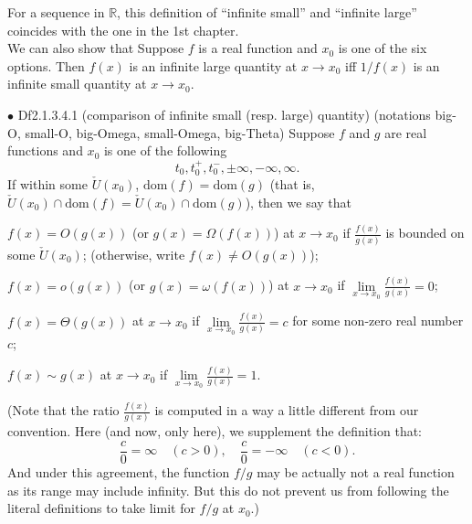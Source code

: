 \documentclass{article}
\begin{document}
\begin{Rmk}{}
    \textcolor{Th}{For a sequence in $\mathbb{R}$, this definition of ``infinite small'' and ``infinite large'' coincides with the one in the 1st chapter.}\\
    We can also show that \textcolor{Th}{Suppose $f$ is a real function and $x_0$ is one of the six options. Then $f(x)$ is an infinite large quantity at $x\rightarrow x_0$ iff $1/f(x)$ is an infinite small quantity at $x\rightarrow x_0$.}
\end{Rmk}

\begin{Df}{$\bullet$ Df2.1.3.4.1 (comparison of infinite small (resp. large) quantity) (notations big-O, small-O, big-Omega, small-Omega, big-Theta)}
    Suppose $f$ and $g$ are real functions and $x_0$ is one of the following
    $$ t_0, t_0^+, t_0^-, \pm\infty, -\infty, \infty. $$
    If within some $\check{U}(x_0)$, $\text{dom}(f) = \text{dom}(g)$ (that is, $\check{U}(x_0)\cap\text{dom}(f) = \check{U}(x_0)\cap\text{dom}(g)$), then we say that
    \begin{compactenum}
        \item $f(x) = O(g(x))$ (or $g(x) = \Omega(f(x))$) at $x\rightarrow x_0$ if $\frac{f(x)}{g(x)}$ is bounded on some $\check{U}(x_0)$; (otherwise, write $f(x) \neq O(g(x))$);
        \item $f(x) = o(g(x))$ (or $g(x) = \omega(f(x))$) at $x\rightarrow x_0$ if $\lim\limits_{x\to x_0}\frac{f(x)}{g(x)} = 0$;
        \item $f(x) = \Theta(g(x))$ at $x\rightarrow x_0$ if $\lim\limits_{x\to x_0}\frac{f(x)}{g(x)} = c$ for some non-zero real number $c$;
        \item $f(x) \sim g(x)$ at $x\rightarrow x_0$ if $\lim\limits_{x\to x_0}\frac{f(x)}{g(x)} = 1$.
    \end{compactenum}
    (Note that the ratio $\frac{f(x)}{g(x)}$ is computed in a way a little different from our convention. Here (and now, only here), we supplement the definition that:
    $$ \frac{c}{0} = \infty\quad (c>0),\quad \frac{c}{0} = -\infty\quad (c<0). $$
    And under this agreement, the function $f/g$ may be actually not a real function as its range may include infinity. But this do not prevent us from following the literal definitions to take limit for $f/g$ at $x_0$.)
\end{Df}
\end{document}
